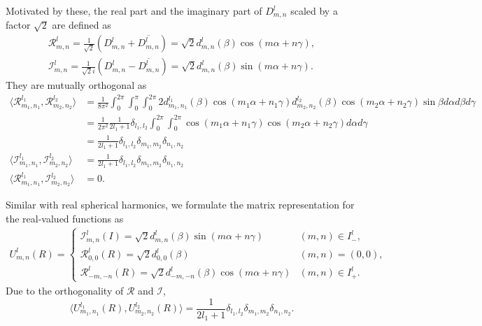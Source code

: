 \documentclass[onecolumn,11pt]{ieeetran}
\newcommand{\pair}[1]{\ensuremath{\langle #1 \rangle}}
\begin{document}
Motivated by these, the real part and the imaginary part of $D^l_{m,n}$ scaled by a factor $\sqrt{2}$ are defined as
\begin{align*}
\mathcal{R}^l_{m,n}=\frac{1}{\sqrt{2}} (D^l_{m,n}+\overline{D^l_{m,n}}) = \sqrt{2} d^l_{m,n}(\beta) \cos (m\alpha+n\gamma),\\
\mathcal{I}^l_{m,n}=\frac{1}{\sqrt{2}i} (D^l_{m,n}-\overline{D^l_{m,n}}) = \sqrt{2} d^l_{m,n}(\beta) \sin (m\alpha+n\gamma).
\end{align*}
They are mutually orthogonal as
\begin{align*}
\pair{\mathcal{R}^{l_1}_{m_1,n_1},\mathcal{R}^{l_2}_{m_2,n_2}}
&= \frac{1}{8\pi^2}\int_0^{2\pi}\int_{0}^\pi\int_0^{2\pi} 2 d^{l_1}_{m_1,n_1}(\beta)\cos(m_1\alpha+n_1\gamma)
d^{l_2}_{m_2,n_2}(\beta)\cos(m_2\alpha+n_2\gamma)\sin\beta d\alpha d\beta d\gamma\\
&=\frac{1}{2\pi^2} \frac{1}{2l_1+1} \delta_{l_1,l_2} \int_0^{2\pi}\int_0^{2\pi}\cos(m_1\alpha+n_1\gamma)
\cos(m_2\alpha+n_2\gamma) d\alpha d\gamma\\
&=\frac{1}{2l_1+1} \delta_{l_1,l_2}\delta_{m_1,m_2}\delta_{n_1,n_2}\\
\pair{\mathcal{I}^{l_1}_{m_1,n_1},\mathcal{I}^{l_2}_{m_2,n_2}}
&=\frac{1}{2l_1+1} \delta_{l_1,l_2}\delta_{m_1,m_2}\delta_{n_1,n_2}\\
\pair{\mathcal{R}^{l_1}_{m_1,n_1},\mathcal{I}^{l_2}_{m_2,n_2}}
&=0.
\end{align*}



Similar with real spherical harmonics, we formulate the matrix representation for the real-valued functions as
\begin{align}
U^l_{m,n}(R) = \begin{cases}
\mathcal{I}^l_{m,n}(I)=\sqrt{2} d^l_{m,n}(\beta) \sin (m\alpha+n\gamma) & (m,n)\in I^l_-,\\
\mathcal{R}^l_{0,0}(R)=\sqrt{2} d^l_{0,0}(\beta) & (m,n)=(0,0),\\
\mathcal{R}^l_{-m,-n}(R)=\sqrt{2} d^l_{-m,-n}(\beta) \cos (m\alpha+n\gamma) & (m,n)\in I^l_+.
\end{cases}
\end{align}
Due to the orthogonality of $\mathcal{R}$ and $\mathcal{I}$, 
\begin{equation}
\pair{ U^{l_1}_{m_1,n_1}(R), U^{l_2}_{m_2,n_2}(R)} = \frac{1}{2l_1+1}\delta_{l_1,l_2}\delta_{m_1,m_2}\delta_{n_1,n_2}. \label{eqn:U_ortho}
\end{equation}
\end{document}
